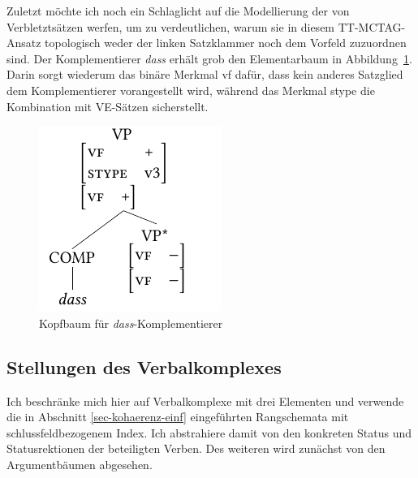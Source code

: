 Zuletzt möchte ich noch ein Schlaglicht auf die Modellierung der  von Verbletztsätzen werfen, um zu verdeutlichen, warum sie in diesem TT-MCTAG-Ansatz topologisch weder der linken Satzklammer noch dem Vorfeld zuzuordnen sind. Der Komplementierer {\it dass} erhält grob den Elementarbaum in Abbildung~\ref{fig-ttmctag-comp}. Darin sorgt wiederum das binäre Merkmal {\sc vf} dafür, dass kein anderes Satzglied dem Komplementierer vorangestellt wird, während das  Merkmal {\sc stype} die Kombination mit VE-Sätzen sicherstellt.

\begin{figure}[p]
\centering
\includegraphics{graphics/abb79.pdf}
\caption{\label{fig-ttmctag-comp}Kopfbaum für \emph{dass}-Komplementierer}
\end{figure} 
  

\subsection{Stellungen des Verbalkomplexes}

Ich beschränke mich hier auf Verbalkomplexe mit drei Elementen und verwende die in Abschnitt \ref{sec-kohaerenz-einf} eingeführten Rangschemata mit schlussfeldbezogenem Index. Ich abstrahiere damit von den konkreten Status und Statusrektionen der beteiligten Verben. Des weiteren wird zunächst von den Argumentbäumen abgesehen.


